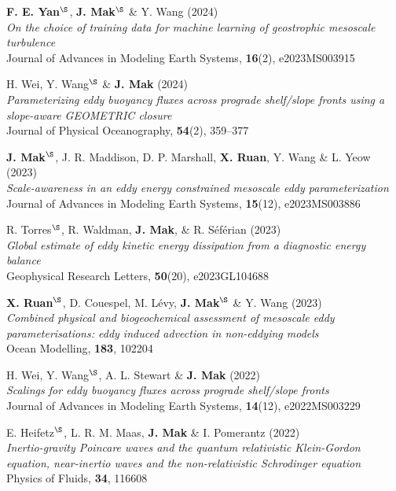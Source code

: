 \documentclass[letterpaper]{article}
\renewenvironment{itemize}{
  \begin{list}{}{
    \setlength{\leftmargin}{1.5em}
  }
}{
  \end{list}
}
\begin{document}
\begin{itemize}
\item[21.] \textbf{F. E. Yan}$^{\S}$, \textbf{J. Mak}$^{\S}$ \& Y. Wang (2024)\\
\textit{On the choice of training data for machine learning of geostrophic mesoscale turbulence}\\
Journal of Advances in Modeling Earth Systems, \textbf{16}(2), e2023MS003915

\item[20.] H. Wei, Y. Wang$^{\S}$ \& \textbf{J. Mak} (2024)\\
\textit{Parameterizing eddy buoyancy fluxes across prograde shelf/slope fronts using a slope-aware GEOMETRIC closure}\\
Journal of Physical Oceanography, \textbf{54}(2), 359--377

\item[19.] \textbf{J. Mak}$^{\S}$, J. R. Maddison, D. P. Marshall, \textbf{X. Ruan}, Y. Wang \& L. Yeow (2023)\\
\textit{Scale-awareness in an eddy energy constrained mesoscale eddy parameterization}\\
Journal of Advances in Modeling Earth Systems, \textbf{15}(12), e2023MS003886

\item[18.] R. Torres$^{\S}$, R. Waldman, \textbf{J. Mak}, \& R. S\'ef\'erian (2023)\\
\textit{Global estimate of eddy kinetic energy dissipation from a diagnostic energy balance}\\
Geophysical Research Letters, \textbf{50}(20), e2023GL104688

\item[17.] \textbf{X. Ruan}$^{\S}$, D. Couespel, M. L\'evy, \textbf{J. Mak}$^{\S}$ \& Y. Wang (2023)\\
\textit{Combined physical and biogeochemical assessment of mesoscale eddy parameterisations: eddy induced advection in non-eddying models}\\
Ocean Modelling, \textbf{183}, 102204

\item[16.] H. Wei, Y. Wang$^{\S}$, A. L. Stewart \& \textbf{J. Mak}
(2022)\\
\textit{Scalings for eddy buoyancy fluxes across prograde shelf/slope fronts}\\
Journal of Advances in Modeling Earth Systems, \textbf{14}(12), e2022MS003229

\item[15.] E. Heifetz$^{\S}$, L. R. M. Maas, \textbf{J. Mak} \& I. Pomerantz (2022)\\
\textit{Inertio-gravity Poincare waves and the quantum relativistic Klein-Gordon equation, near-inertio waves and the non-relativistic Schrodinger equation}\\
Physics of Fluids, \textbf{34}, 116608


\end{itemize}
\end{document}
